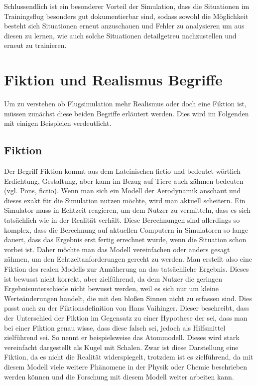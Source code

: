 \documentclass[12pt]{article}
\begin{document}
Schlussendlich ist ein besonderer Vorteil der Simulation, dass die Situationen im Trainingsflug besonders gut dokumentierbar sind, sodass sowohl die Möglichkeit besteht sich Situationen erneut anzuschauen und Fehler zu analysieren um aus diesen zu lernen, wie auch solche Situationen detailgetreu nachzustellen und erneut zu trainieren.
%
%
\section{Fiktion und Realismus Begriffe}
Um zu verstehen ob Flugsimulation mehr Realismus oder doch eine Fiktion ist, müssen zunächst diese beiden Begriffe erläutert werden. Dies wird im Folgenden mit einigen Beispielen verdeutlicht.
\subsection{Fiktion}
Der Begriff Fiktion kommt aus dem Lateinischen \glqq fictio\grqq{} und bedeutet wörtlich Erdichtung, Gestaltung, aber kann im Bezug auf Tiere auch zähmen bedeuten (vgl. Pons, fictio).\newline
Wenn man sich ein Modell der Aerodynamik anschaut und dieses exakt für die Simulation nutzen möchte, wird man aktuell scheitern. Ein Simulator muss in Echtzeit reagieren, um dem Nutzer zu vermitteln, dass es sich tatsächlich wie in der Realität verhält. Diese Berechnungen sind allerdings so komplex, dass die Berechnung auf aktuellen Computern in Simulatoren so lange dauert, dass das Ergebnis erst fertig errechnet wurde, wenn die Situation schon vorbei ist. Daher möchte man das Modell vereinfachen oder anders gesagt \glqq zähmen\grqq{}, um den Echtzeitanforderungen gerecht zu werden. Man erstellt also eine Fiktion des realen Modells zur Annäherung an das tatsächliche Ergebnis. Dieses ist bewusst nicht korrekt, aber zielführend, da dem Nutzer die geringen Ergebnisunterschiede nicht bewusst werden, weil es sich nur um kleine Werteänderungen handelt, die mit den bloßen Sinnen nicht zu erfassen sind.\newline
Dies passt auch zu der Fiktionsdefinition von Hans Vaihinger. Dieser beschreibt, dass der Unterschied der Fiktion im Gegensatz zu einer Hypothese der sei, dass man bei einer Fiktion genau wisse, dass diese falsch sei, jedoch als Hilfsmittel zielführend sei. So nennt er beispielsweise das Atommodell. Dieses wird stark vereinfacht dargestellt als Kugel mit Schalen. Zwar ist diese Darstellung eine Fiktion, da es nicht die Realität widerspiegelt, trotzdem ist es zielführend, da mit diesem Modell viele weitere Phänomene in der Physik oder Chemie beschrieben werden können und die Forschung mit diesem Modell weiter arbeiten kann.\newline
\end{document}
